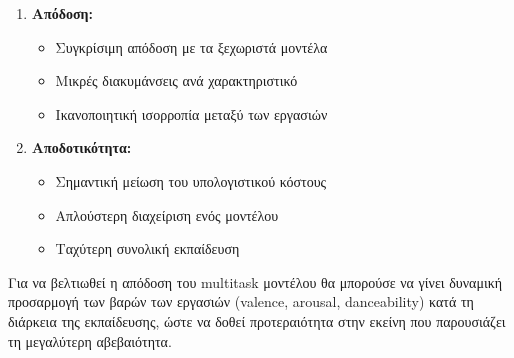 \documentclass[a4paper,12pt]{article}
\begin{document}
\begin{enumerate}
    \item \textbf{Απόδοση:}
    \begin{itemize}
        \item Συγκρίσιμη απόδοση με τα ξεχωριστά μοντέλα
        \item Μικρές διακυμάνσεις ανά χαρακτηριστικό
        \item Ικανοποιητική ισορροπία μεταξύ των εργασιών
    \end{itemize}
    
    \item \textbf{Αποδοτικότητα:}
    \begin{itemize}
        \item Σημαντική μείωση του υπολογιστικού κόστους
        \item Απλούστερη διαχείριση ενός μοντέλου
        \item Ταχύτερη συνολική εκπαίδευση
    \end{itemize}
    
\end{enumerate}

Για να βελτιωθεί η απόδοση του multitask μοντέλου θα μπορούσε να γίνει δυναμική
προσαρμογή των βαρών των εργασιών (valence, arousal, danceability) κατά τη διάρκεια της εκπαίδευσης, ώστε να
δοθεί προτεραιότητα στην εκείνη που παρουσιάζει τη μεγαλύτερη αβεβαιότητα.




\end{document}
